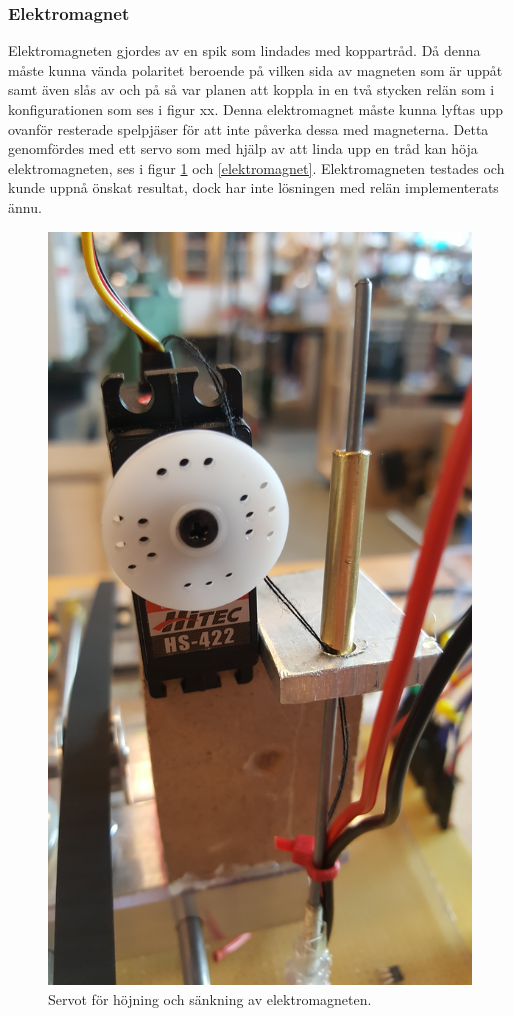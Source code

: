 \documentclass[a4paper]{article}
\begin{document}
\subsubsection*{Elektromagnet}
Elektromagneten gjordes av en spik som lindades med koppartråd.
Då denna måste kunna vända polaritet beroende på vilken sida av magneten som är uppåt samt även slås av och på så var planen att koppla in en två stycken relän som i konfigurationen som ses i figur xx.
Denna elektromagnet måste kunna lyftas upp ovanför resterade spelpjäser för att inte påverka dessa med magneterna.
Detta genomfördes med ett servo som med hjälp av att linda upp en tråd kan höja elektromagneten, ses i figur \ref{servo_fram} och \ref{elektromagnet}.
Elektromagneten testades och kunde uppnå önskat resultat, dock har inte lösningen med relän implementerats ännu.
\begin{figure}\label{servo_fram}
\centering
\includegraphics[width=\textwidth,keepaspectratio]{../images/servo_fram}
\caption{Servot för höjning och sänkning av elektromagneten.}
\end{figure}
\end{document}
